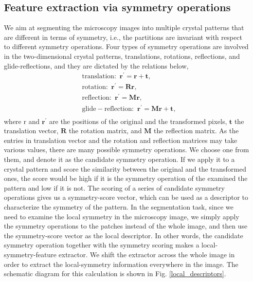 \documentclass[twocolumn,amsmath, floatfix]{revtex4}
\begin{document}
\subsection{Feature extraction via symmetry operations}
We aim at segmenting the microscopy images into multiple crystal patterns that are different in terms of symmetry, i.e., the partitions are invariant with respect to different symmetry operations.  Four types of symmetry operations are involved in the two-dimensional crystal patterns, translations, rotations, reflections, and glide-reflections, and they are dictated by the relations below,
\begin{equation}
\begin{aligned}
   & \mathrm{translation : \,\,} \mathbf{r}^\prime = \mathbf{r} + \mathbf{t}, \\
   & \mathrm{rotation: \,\,} \mathbf{r}^\prime = \mathbf{R}\mathbf{r}, \\
   & \mathrm{reflection: \,\,} \mathbf{r}^\prime = \mathbf{M}\mathbf{r}, \\
   & \mathrm{glide-reflection: \,\,} \mathbf{r}^\prime = \mathbf{M}\mathbf{r} + \mathbf{t},\\
\end{aligned}
\end{equation}
where $\mathrm{r}$ and $\mathbf{r}^\prime$ are the positions of the original and the transformed pixels,  $\mathbf{t}$ the translation vector, $\mathbf{R}$ the rotation matrix, and $\mathbf{M}$ the reflection matrix.
As the entries in translation vector and the rotation and reflection matrices may take various values, there are many possible symmetry operations. 
We choose one from them, and denote it as the candidate symmetry operation. If we apply it to a crystal pattern and score the similarity between the original and the transformed ones, the score would be high if it is the symmetry operation of the examined the pattern and low if it is not. The scoring of a series of candidate symmetry operations gives us a symmetry-score vector, which can be used as a descriptor to characterize the symmetry of the pattern. In the segmentation task, since we need to examine the local symmetry in the microscopy image, we simply apply the symmetry operations to the patches instead of the whole image, and then use the symmetry-score vector as the local descriptor.
In other words, the candidate symmetry operation together with the symmetry scoring makes a local-symmetry-feature extractor.  We shift the extractor across the whole image in order to extract the local-symmetry information everywhere in the image. The schematic diagram for this calculation is shown in Fig. \ref{local_descriptors}. 
\end{document}
